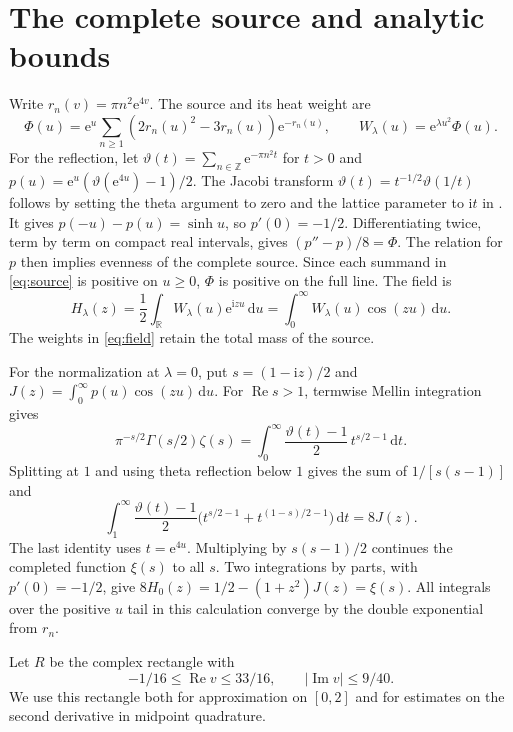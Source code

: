 \documentclass[11pt]{article}
\newcommand{\e}{\mathrm e}
\newcommand{\ii}{\mathrm i}
\newcommand{\dd}{\mathrm d}
\newcommand{\R}{\mathbb R}
\begin{document}
\section{The complete source and analytic bounds}
\label{sec:source}

Write \(r_n(v)=\pi n^2\e^{4v}\). The source and its heat weight are
\begin{equation}
 \Phi(u)=\e^u\sum_{n\ge1}(2r_n(u)^2-3r_n(u))\e^{-r_n(u)},
 \qquad W_\lambda(u)=\e^{\lambda u^2}\Phi(u).
 \label{eq:source}
\end{equation}
For the reflection, let
\(\vartheta(t)=\sum_{n\in\mathbb Z}\e^{-\pi n^2t}\) for \(t>0\) and
\(p(u)=\e^u(\vartheta(\e^{4u})-1)/2\). The Jacobi transform
\(\vartheta(t)=t^{-1/2}\vartheta(1/t)\) follows by setting the theta
argument to zero and the lattice parameter to \(\ii t\) in
\cite[Eqs.~20.2.3 and 20.7.32]{dlmf}. It gives
\(p(-u)-p(u)=\sinh u\), so \(p'(0)=-1/2\). Differentiating twice,
term by term on compact real intervals, gives \((p''-p)/8=\Phi\).
The relation for \(p\) then implies evenness of the complete source.
Since each summand in \eqref{eq:source} is positive on \(u\ge0\),
\(\Phi\) is positive on the full line. The field is
\begin{equation}
 H_\lambda(z)=\frac12\int_{\R}W_\lambda(u)\e^{\ii zu}\,\dd u
             =\int_0^\infty W_\lambda(u)\cos(zu)\,\dd u.
 \label{eq:field}
\end{equation}
The weights in \eqref{eq:field} retain the total mass of the source.

For the normalization at \(\lambda=0\), put \(s=(1-\ii z)/2\) and
\(J(z)=\int_0^\infty p(u)\cos(zu)\,\dd u\).
For \(\operatorname{Re}s>1\), termwise Mellin integration gives
\[
 \pi^{-s/2}\Gamma(s/2)\zeta(s)
  =\int_0^\infty \frac{\vartheta(t)-1}{2}\,t^{s/2-1}\,\dd t.
\]
Splitting at \(1\) and using theta reflection below \(1\) gives the
sum of \(1/[s(s-1)]\) and
\[
 \int_1^\infty \frac{\vartheta(t)-1}{2}
       \bigl(t^{s/2-1}+t^{(1-s)/2-1}\bigr)\,\dd t=8J(z).
\]
The last identity uses \(t=\e^{4u}\). Multiplying by \(s(s-1)/2\)
continues the completed function \(\xi(s)\) to all \(s\). Two integrations
by parts, with \(p'(0)=-1/2\), give \(8H_0(z)=1/2-(1+z^2)J(z)=\xi(s)\).
All integrals over the positive \(u\) tail in this calculation converge
by the double exponential from \(r_n\).

Let \(R\) be the complex rectangle with
\[
  -1/16\le\operatorname{Re}v\le33/16,\qquad
  |\operatorname{Im}v|\le9/40 .
\]
We use this rectangle both for approximation on \([0,2]\) and for
estimates on the second derivative in midpoint quadrature.
\end{document}
